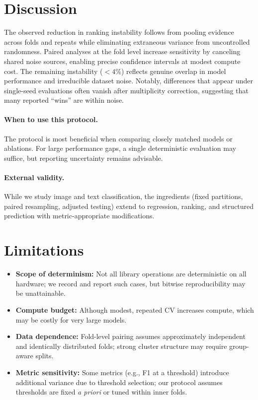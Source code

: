 \documentclass[11pt]{article}
\begin{document}
\section{Discussion}
The observed reduction in ranking instability follows from pooling evidence across folds and repeats while eliminating extraneous variance from uncontrolled randomness. Paired analyses at the fold level increase sensitivity by canceling shared noise sources, enabling precise confidence intervals at modest compute cost. The remaining instability (\(<4\%\)) reflects genuine overlap in model performance and irreducible dataset noise. Notably, differences that appear under single-seed evaluations often vanish after multiplicity correction, suggesting that many reported ``wins'' are within noise.

\paragraph{When to use this protocol.} The protocol is most beneficial when comparing closely matched models or ablations. For large performance gaps, a single deterministic evaluation may suffice, but reporting uncertainty remains advisable.

\paragraph{External validity.} While we study image and text classification, the ingredients (fixed partitions, paired resampling, adjusted testing) extend to regression, ranking, and structured prediction with metric-appropriate modifications.

\section{Limitations}
\begin{itemize}
  \item \textbf{Scope of determinism:} Not all library operations are deterministic on all hardware; we record and report such cases, but bitwise reproducibility may be unattainable.
  \item \textbf{Compute budget:} Although modest, repeated CV increases compute, which may be costly for very large models.
  \item \textbf{Data dependence:} Fold-level pairing assumes approximately independent and identically distributed folds; strong cluster structure may require group-aware splits.
  \item \textbf{Metric sensitivity:} Some metrics (e.g., F1 at a threshold) introduce additional variance due to threshold selection; our protocol assumes thresholds are fixed \emph{a priori} or tuned within inner folds.
\end{itemize}
\end{document}
